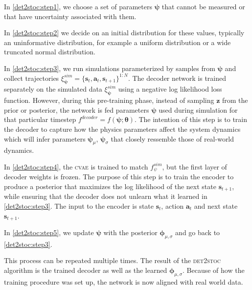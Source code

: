 \documentclass{kththesis}
\makeatletter
\newcommand{\vz}{\boldsymbol{z}}
\newcommand{\vx}{\boldsymbol{x}}
\newcommand{\vy}{\boldsymbol{y}}
\newcommand{\vth}{\boldsymbol{\theta}}
\newcommand{\vph}{\boldsymbol{\phi}}
\newcommand{\vpsi}{\vec{\psi}}
\renewcommand{\vec}[1]{\boldsymbol{#1}}
\newcommand{\@giventhatstar}[2]{\ensuremath{\left({#1}\;\middle|\;{#2}\right)}}
\newcommand{\@giventhatnostar}[3][]{#1(#2\,#1|\,#3#1)}
\newcommand{\given}{\@ifstar\@giventhatstar\@giventhatnostar}
\newcommand{\cvae}{\textsc{cvae}}
\newcommand{\dettostoc}{\textsc{det2stoc}}
\newcommand{\vs}{\pmb{s}_t}
\newcommand{\va}{\pmb{a}_t}
\newcommand{\vns}{\pmb{s}_{t+1}}
\newcommand{\fpsisimulator}{\ensuremath{f^{sim}_{\psi}}}
\newcommand{\fdecoder}{\ensuremath{f^{decoder}}}
\newcommand{\trajsim}{\xi^{sim}}
\makeatother
\begin{document}
In \ref{det2stoc:step1}, we choose a set of parameters $\vpsi$ that cannot be measured or that have uncertainty associated with them.

In \ref{det2stoc:step2} we decide on an initial distribution for these values, typically an uninformative distribution, for example a uniform distribution or a wide truncated normal distribution. 

In \ref{det2stoc:step3}, we run simulations parameterized by samples from $\vpsi$ and collect trajectories $\trajsim_{\vpsi}=\{\vs, \va, \vns\}^{1:N}$. The decoder network is trained separately on the simulated data $\trajsim_{\vec{\psi}}{}$ using a negative log likelihood loss function. However, during this pre-training phase, instead of sampling $\vz$ from the prior or posterior, the network is fed parameters $\vpsi$ used during simulation for that particular timestep $\fdecoder = f(\vpsi; \vth)$. The intention of this step is to train the decoder to capture how the physics parameters affect the system dynamics which will infer parameters $\vpsi_\mu$, $\vpsi_\sigma$ that closely ressemble those of real-world dynamics.

In \ref{det2stoc:step4}, the \cvae{} is trained to match $\fpsisimulator{}$, but the first layer of decoder weights is frozen. The purpose of this step is to train the encoder to produce a posterior that maximizes the log likelihood of the next state $\vns$, while ensuring that the decoder does not unlearn what it learned in \ref{det2stoc:step3}. The input to the encoder is state $\vs$, action $\va$ and next state $\vns$. %

In \ref{det2stoc:step5}, we update $\vpsi$ with the posterior $\vph_{\mu,\sigma}$ and go back to \ref{det2stoc:step3}.

This process can be repeated multiple times. The result of the \dettostoc{} algorithm is the trained decoder as well as the learned $\vph_{\mu, \sigma}$. Because of how the training procedure was set up, the network is now aligned with real world data.

\end{document}

